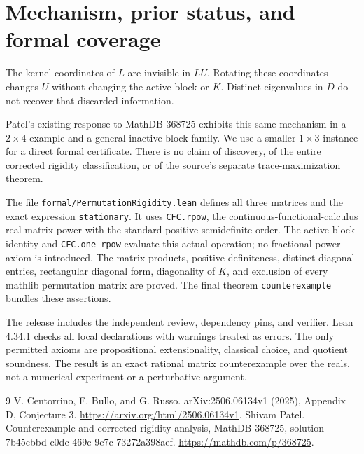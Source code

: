 \documentclass[11pt]{article}
\begin{document}
\section{Mechanism, prior status, and formal coverage}
The kernel coordinates of $L$ are invisible in $LU$. Rotating these coordinates changes $U$ without changing the active block or $K$. Distinct eigenvalues in $D$ do not recover that discarded information.

Patel's existing response to MathDB 368725 \cite{patel} exhibits this same mechanism in a $2\times4$ example and a general inactive-block family. We use a smaller $1\times3$ instance for a direct formal certificate. There is no claim of discovery, of the entire corrected rigidity classification, or of the source's separate trace-maximization theorem.

The file \nolinkurl{formal/PermutationRigidity.lean} defines all three matrices and the exact expression \nolinkurl{stationary}. It uses \nolinkurl{CFC.rpow}, the continuous-functional-calculus real matrix power with the standard positive-semidefinite order. The active-block identity and \nolinkurl{CFC.one_rpow} evaluate this actual operation; no fractional-power axiom is introduced. The matrix products, positive definiteness, distinct diagonal entries, rectangular diagonal form, diagonality of $K$, and exclusion of every mathlib permutation matrix are proved. The final theorem \nolinkurl{counterexample} bundles these assertions.

The release includes the independent review, dependency pins, and verifier. Lean 4.34.1 checks all local declarations with warnings treated as errors. The only permitted axioms are propositional extensionality, classical choice, and quotient soundness. The result is an exact rational matrix counterexample over the reals, not a numerical experiment or a perturbative argument.
\begin{thebibliography}{9}
 V. Centorrino, F. Bullo, and G. Russo. arXiv:2506.06134v1 (2025), Appendix D, Conjecture 3. \url{https://arxiv.org/html/2506.06134v1}.
 Shivam Patel. Counterexample and corrected rigidity analysis, MathDB 368725, solution 7b45cbbd-c0dc-469c-9c7c-73272a398aef. \url{https://mathdb.com/p/368725}.
\end{thebibliography}
\end{document}
